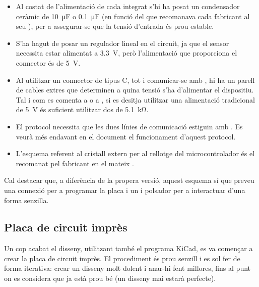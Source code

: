 \begin{itemize}
    \item Al costat de l'alimentació de cada integrat s'hi ha posat un
    condensador ceràmic de
    \SI[round-mode=places,round-precision=0]{10}{\micro\farad} o
    \SI[round-mode=places,round-precision=1]{0.1}{\micro\farad}
    (en funció del que recomanava
    cada fabricant al seu ), per a assegurar-se que la tensió
    d'entrada és prou estable.
    \item S'ha hagut de posar un regulador lineal en el circuit, ja que el
    sensor necessita estar alimentat a
    \SI[round-mode=places,round-precision=1]{3.3}{\volt},
    però l'alimentació que proporciona
    el connector  és de \SI[round-mode=places,round-precision=0]{5}{\volt}.
    \item Al utilitzar un connector de tipus C, tot i comunicar-se amb
    , hi ha un parell de cables extres que determinen a quina tensió
    s'ha d'alimentar el dispositiu. Tal i com es comenta a \cite{Axelson2015USB}
    o a \cite{TypeCIntro}, si es desitja utilitzar una alimentació tradicional de 
    \SI[round-mode=places,round-precision=0]{5}{\volt} és suficient
    utilitzar dos  de
    \SI[round-mode=places,round-precision=1]{5.1}{\kilo\ohm}.
    \item El protocol  necessita que les dues línies de comunicació
    estiguin amb . Es veurà més endavant en el document el
    funcionament d'aquest protocol.
    \item L'esquema referent al cristall extern per al rellotge del microcontrolador
    és el recomanat pel fabricant en el mateix  \cite{AtMega32u4}.
\end{itemize}

Cal destacar que, a diferència de la propera versió, aquest esquema sí que preveu
una connexió  per a programar la placa i un  i polsador per
a interactuar d'una forma senzilla.

\subsection{Placa de circuit imprès}

Un cop acabat el disseny, utilitzant també el programa KiCad, es va començar a
crear la placa de circuit imprès. El procediment és prou senzill i es sol fer
de forma iterativa: crear un disseny molt dolent i anar-hi fent millores, fins
al punt on es considera que ja està prou bé (un disseny mai estarà perfecte).

